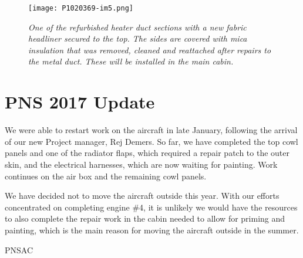 \begin{figure}[htbp]
   \vspace{2em}
   \centering
   \texttt{[image: P1020369-im5.png]}
   \caption*{\small \em One of the refurbished heater duct sections with a new fabric headliner secured to the top. The sides are covered with mica insulation that was removed, cleaned and reattached after repairs to the metal duct. These will be installed in the main cabin.}
   \label{fig:heaters_liners}
\end{figure}

\section{PNS 2017 Update}
\label{sec:pnsupdate}

We were able to restart work on the aircraft in late January, following the
arrival of our new Project manager, Rej Demers. So far, we have completed the
top cowl panels and one of the radiator flaps, which required a repair patch to
the outer skin, and the electrical harnesses, which are now waiting for
painting. Work continues on the air box and the remaining cowl panels.

We have decided not to move the aircraft outside this year. With our efforts
concentrated on completing engine \#4, it is unlikely we would have the resources
to also complete the repair work in the cabin needed to allow for priming and
painting, which is the main reason for moving the aircraft outside in the summer.


\begin{footnotesize}
  \raggedleft PNSAC\\
\end{footnotesize}



